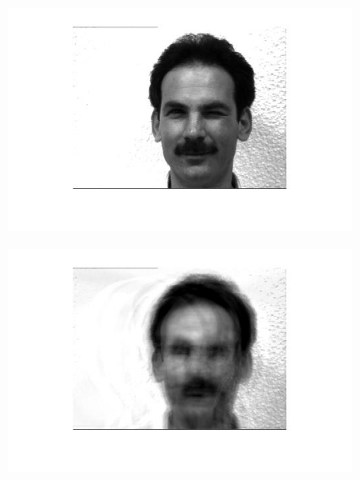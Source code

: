 \documentclass[a4paper]{iacas}
\begin{document}
\begin{figure}[!htbp]
	\begin{subfigure}[b]{0.4\textwidth}
		\includegraphics[width=\textwidth]{3202.jpg}
		\caption{}
		\label{fig:3202}
	\end{subfigure}
	\begin{subfigure}[b]{0.4\textwidth}
		\includegraphics[width=\textwidth]{3201.jpg}
		\caption{}
		\label{fig:3201}
	\end{subfigure}
	

\end{figure}
\end{document}
